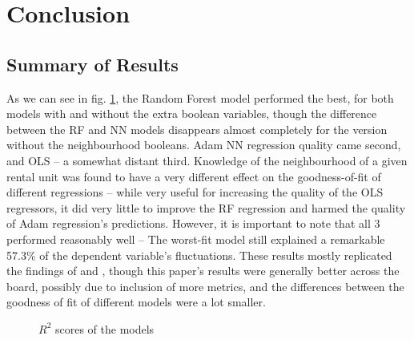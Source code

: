 \documentclass[12pt]{report}
\begin{document}
\section{Conclusion}
\subsection{Summary of Results}

As we can see in fig. \ref{fig:summary}, the Random Forest model performed the best, for both models with and without the extra boolean variables, though the difference between the RF and NN models disappears almost completely for the version without the neighbourhood booleans. Adam NN regression quality came second, and OLS -- a somewhat distant third. Knowledge of the neighbourhood of a given rental unit was found to have a very different effect on the goodness-of-fit of different regressions -- while very useful for increasing the quality of the OLS regressors, it did very little to improve the RF regression and harmed the quality of Adam regression's predictions. However, it is important to note that all 3 performed reasonably well -- The worst-fit model still explained a remarkable 57.3\% of the dependent variable's fluctuations. These results mostly replicated the findings of \cite{yoshida2022} and \cite{neloy2019}, though this paper's results were generally better across the board, possibly due to inclusion of more metrics, and the differences between the goodness of fit of different models were a lot smaller.

\begin{figure}[h]
	\centering
	\caption{$R^2$ scores of the models}
	\label{fig:summary}
\end{figure}
\end{document}
